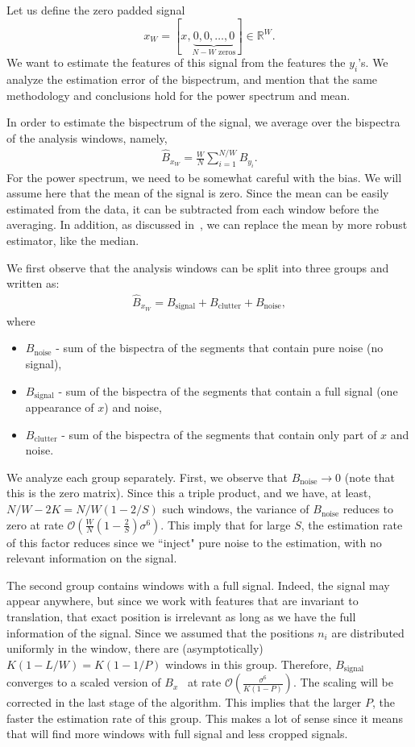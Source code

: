 \documentclass[journal]{IEEEtran}
\numberwithin{equation}{section}
\numberwithin{figure}{section}
\theoremstyle{plain}
\theoremstyle{definition}
\theoremstyle{remark}
\theoremstyle{plain}
\theoremstyle{remark}
\theoremstyle{plain}
\theoremstyle{plain}
\newcommand{\order}[1]{\mathcal{O}\left({#1} \right)}
\begin{document}
Let us define  the zero padded signal $$x_W  = [x, \underbrace{0,0,\ldots,0}_{N-W \text{ zeros}}]\in\mathbb{R}^W.$$ 
We want to estimate the features of this signal from the features the $y_i$'s. We analyze the estimation error of the bispectrum, and mention that the same methodology and conclusions hold for the power spectrum and mean.


In order to estimate the bispectrum of the signal, we average over the bispectra of the analysis windows, namely,
\begin{eqnarray}
\hat{B}_{x_W} = \frac{W}{N}\sum_{i=1}^{N/W}B_{y_i}.
\end{eqnarray}
For the power spectrum, we need  to be somewhat careful with the bias. We will assume here that the mean of the signal is zero. Since the mean can be easily estimated from the data, it can be subtracted from each window before the averaging. 
 In addition, as discussed in~\cite{bendory2017bispectrum}, we can replace the mean by more robust estimator, like the median.

We first observe that the analysis windows can be split into three groups and written as:
\begin{eqnarray}
\hat{B}_{x_W} = B_\textrm{signal} + B_\textrm{clutter} + B_\textrm{noise}, 
\end{eqnarray}
where
\begin{itemize}
	\item $B_\textrm{noise}$ - sum of the bispectra of the segments that contain pure noise (no signal),
	\item $B_\textrm{signal}$ - sum of the bispectra of the segments that contain a full signal (one appearance of $x$) and noise,
	\item $B_\textrm{clutter}$ - sum of the bispectra of the segments that contain only part of $x$ and noise.
\end{itemize}

We analyze each group separately. First, we observe that $B_\textrm{noise}\to 0$ (note that this is the zero matrix). Since this a triple product, and we have, at least, $N/W-2K =N/W(1-2/S) $ such windows, the variance of $B_\textrm{noise}$ reduces to zero at rate  $\order{\frac{W}{N}\left(1-\frac{2}{S}\right)\sigma^6}$. This imply that for large $S$, the estimation rate of this factor reduces since we ``inject" pure noise to the estimation, with no relevant information on the signal.

The second group contains windows with a full signal. Indeed, the signal may appear anywhere, but since we work with features that are invariant to translation, that exact position is irrelevant as long as we have the full information of the signal. Since we assumed that the positions  $n_i$ are distributed uniformly in the window, there are (asymptotically) $K(1-L/W) = K(1-1/P)$ windows in this group. 
Therefore, $B_\textrm{signal}$ converges to a scaled version of $B_x$  \ at rate $\order{\frac{\sigma^6}{K(1-P)}}$. The scaling will be corrected in the last stage of the algorithm. This implies that the larger $P$, the faster the estimation rate of this group. This makes a lot of sense since it means that will find more windows with full signal and less cropped signals.
\end{document}
